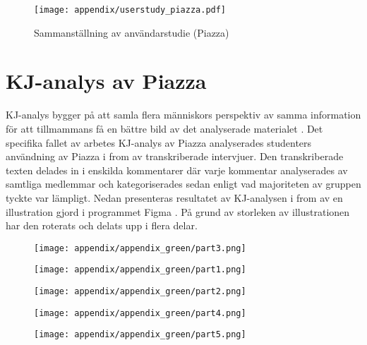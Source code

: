 \begin{figure}[H]
    \centering
    \texttt{[image: appendix/userstudy\_piazza.pdf]}
    \caption*{Sammanställning av användarstudie (Piazza)}
    \label{fig:piazzausersurvey}
\end{figure}

\section{KJ-analys av Piazza}
\label{app:KJ-analys}
KJ-analys bygger på att samla flera människors perspektiv av samma information för att tillmammans få en bättre bild av det analyserade materialet \cite{kj}. Det specifika fallet av arbetes KJ-analys av Piazza analyserades studenters användning av Piazza i from av transkriberade intervjuer. Den transkriberade texten delades in i enskilda kommentarer där varje kommentar analyserades av samtliga medlemmar och kategoriserades sedan enligt vad majoriteten av gruppen tyckte var lämpligt. Nedan presenteras resultatet av KJ-analysen i from av en illustration gjord i programmet Figma \cite{figma}. På grund av storleken av illustrationen har den roterats och delats upp i flera delar.

\begin{figure}[H]
    \centering
    \texttt{[image: appendix/appendix\_green/part3.png]}
    \caption*{}
    \label{fig:nr8_part4}
\end{figure}

\begin{figure}[H]
    \centering
    \texttt{[image: appendix/appendix\_green/part1.png]}
    \caption*{}
    \label{fig:nr8_part10}
\end{figure}

\begin{figure}[H]
    \centering
    \texttt{[image: appendix/appendix\_green/part2.png]}
    \caption*{}
    \label{fig:nr8_part5}
\end{figure}

\begin{figure}[H]
    \centering
    \texttt{[image: appendix/appendix\_green/part4.png]}
    \caption*{}
    \label{fig:nr8_part6}
\end{figure}

\begin{figure}[H]
    \centering
    \texttt{[image: appendix/appendix\_green/part5.png]}
    \caption*{}
    \label{fig:nr8_part7}
\end{figure}

